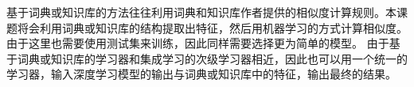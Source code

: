 基于词典或知识库的方法往往利用词典和知识库作者提供的相似度计算规则。本课题将会利用词典或知识库的结构提取出特征，然后用机器学习的方式计算相似度。由于这里也需要使用测试集来训练，因此同样需要选择更为简单的模型。
由于基于词典或知识库的学习器和集成学习的次级学习器相近，因此也可以用一个统一的学习器，输入深度学习模型的输出与词典或知识库中的特征，输出最终的结果。